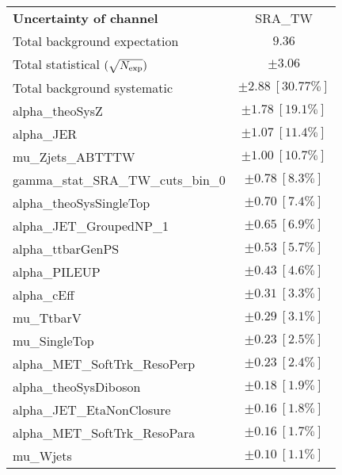 
\begin{table}
\begin{center}
\setlength{\tabcolsep}{0.0pc}
\begin{tabular*}{\textwidth}{@{\extracolsep{\fill}}lc}
\noalign{\smallskip}\hline\noalign{\smallskip}
{\bf Uncertainty of channel}                                    & SRA\_TW            \\
\noalign{\smallskip}\hline\noalign{\smallskip}
Total background expectation             &  $9.36$       \\
\noalign{\smallskip}\hline\noalign{\smallskip}
Total statistical $(\sqrt{N_{\rm exp}})$              & $\pm 3.06$       \\
Total background systematic               & $\pm 2.88\ [30.77\%] $             \\
\noalign{\smallskip}\hline\noalign{\smallskip}
\noalign{\smallskip}\hline\noalign{\smallskip}
alpha\_theoSysZ         & $\pm 1.78\ [19.1\%] $       \\
alpha\_JER         & $\pm 1.07\ [11.4\%] $       \\
mu\_Zjets\_ABTTTW         & $\pm 1.00\ [10.7\%] $       \\
gamma\_stat\_SRA\_TW\_cuts\_bin\_0         & $\pm 0.78\ [8.3\%] $       \\
alpha\_theoSysSingleTop         & $\pm 0.70\ [7.4\%] $       \\
alpha\_JET\_GroupedNP\_1         & $\pm 0.65\ [6.9\%] $       \\
alpha\_ttbarGenPS         & $\pm 0.53\ [5.7\%] $       \\
alpha\_PILEUP         & $\pm 0.43\ [4.6\%] $       \\
alpha\_cEff         & $\pm 0.31\ [3.3\%] $       \\
mu\_TtbarV         & $\pm 0.29\ [3.1\%] $       \\
mu\_SingleTop         & $\pm 0.23\ [2.5\%] $       \\
alpha\_MET\_SoftTrk\_ResoPerp         & $\pm 0.23\ [2.4\%] $       \\
alpha\_theoSysDiboson         & $\pm 0.18\ [1.9\%] $       \\
alpha\_JET\_EtaNonClosure         & $\pm 0.16\ [1.8\%] $       \\
alpha\_MET\_SoftTrk\_ResoPara         & $\pm 0.16\ [1.7\%] $       \\
mu\_Wjets         & $\pm 0.10\ [1.1\%] $       \\

\end{tabular*}
\end{center}
\end{table}
